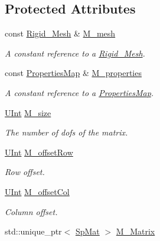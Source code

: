 \subsection*{Protected Attributes}
\begin{DoxyCompactItemize}
\item 
const \hyperlink{classFVCode3D_1_1Rigid__Mesh}{Rigid\+\_\+\+Mesh} \& \hyperlink{classFVCode3D_1_1MatrixHandler_a72f185cb557fc2e8023bd09a074f685c}{M\+\_\+mesh}
\begin{DoxyCompactList}\small\item\em A constant reference to a \hyperlink{classFVCode3D_1_1Rigid__Mesh}{Rigid\+\_\+\+Mesh}. \end{DoxyCompactList}\item 
const \hyperlink{classFVCode3D_1_1PropertiesMap}{Properties\+Map} \& \hyperlink{classFVCode3D_1_1MatrixHandler_ad17a7941b1b8272f50fc6e1c660103fa}{M\+\_\+properties}
\begin{DoxyCompactList}\small\item\em A constant reference to a \hyperlink{classFVCode3D_1_1PropertiesMap}{Properties\+Map}. \end{DoxyCompactList}\item 
\hyperlink{namespaceFVCode3D_a4bf7e328c75d0fd504050d040ebe9eda}{U\+Int} \hyperlink{classFVCode3D_1_1MatrixHandler_a0162a412f52cf9a540ea359e6a5c9a6f}{M\+\_\+size}
\begin{DoxyCompactList}\small\item\em The number of dofs of the matrix. \end{DoxyCompactList}\item 
\hyperlink{namespaceFVCode3D_a4bf7e328c75d0fd504050d040ebe9eda}{U\+Int} \hyperlink{classFVCode3D_1_1MatrixHandler_ad3faa8b15bca6e0052be8c868b924444}{M\+\_\+offset\+Row}
\begin{DoxyCompactList}\small\item\em Row offset. \end{DoxyCompactList}\item 
\hyperlink{namespaceFVCode3D_a4bf7e328c75d0fd504050d040ebe9eda}{U\+Int} \hyperlink{classFVCode3D_1_1MatrixHandler_a6ec7cf5178c1c25b54abc46ff0affcf2}{M\+\_\+offset\+Col}
\begin{DoxyCompactList}\small\item\em Column offset. \end{DoxyCompactList}\item 
std\+::unique\+\_\+ptr$<$ \hyperlink{namespaceFVCode3D_ac1032289d96638cf0ad6c52ef639095f}{Sp\+Mat} $>$ \hyperlink{classFVCode3D_1_1MatrixHandler_ae266bd543d9369501ed9317d9ba6a07b}{M\+\_\+\+Matrix}

\end{DoxyCompactItemize}
